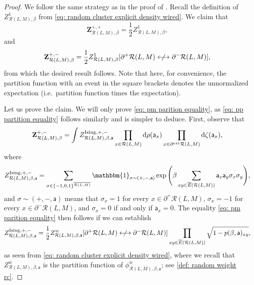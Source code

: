 \documentclass[11pt,a4paper]{article}
\numberwithin{equation}{section}
\theoremstyle{plain}
\theoremstyle{definition}
\begin{document}
\begin{proof} 
We follow the same strategy as in the proof of \cite[Lemma~5.3]{gunaratnam2025supercritical}. Recall the definition of $Z^1_{\mathcal{R}(L,M),\beta}$ from \eqref{eq: random cluster explicit density wired}. We claim that  
\begin{equation}\label{eq: pp partition equality}
\mathbf{Z}^{+,+}_{\mathcal{R}(L,M),\beta}=\frac{1}{2}Z^1_{\mathcal R(L,M),\beta},   
\end{equation}
and
\begin{equation}\label{eq: pm parition equality}
\mathbf{Z}^{+,-}_{\mathcal{R}(L,M),\beta}=\frac{1}{2}Z^1_{\mathcal R(L,M),\beta}[\partial^+\mathcal{R}(L,M)\centernot\longleftrightarrow \partial^-\mathcal{R}(L,M)],   
\end{equation}
from which the desired result follows. Note that here, for convenience, the partition function with an event in the square brackets denotes the unnormalized expectation (i.e.\ partition function times the expectation).

Let us prove the claim. We will only prove \eqref{eq: pm parition equality}, as \eqref{eq: pp partition equality} follows similarly and is simpler to deduce. First, observe that 
\begin{equation}
\mathbf{Z}^{+,-}_{\mathcal{R}(L,M),\beta}=\int Z^{\rm Ising,+,-}_{\mathcal{R}(L,M),\beta,\mathsf{a}}
\prod_{x\in \mathcal{R}(L,M)}\mathrm{d} \rho(\mathsf{a}_x) \prod_{x\in \partial^{\textup{ext}}\mathcal{R}(L,M)}\mathrm{d}\zeta(\mathsf{a}_x),  
\end{equation}
where
\begin{equation}\label{eq:Ising_def}
Z^{\rm Ising,+,-}_{\mathcal{R}(L,M),\beta,\mathsf{a}}=\sum_{\sigma\in \{-1,0,1\}^{\overline{\mathcal{R}(L,M)}}} \mathbbm{1}_{\sigma\sim (+,-,\mathsf{a})}
 \exp\Bigg( \beta\sum_{xy\in \overline{E}(\mathcal{R}(L,M))}  \mathsf a_x \mathsf{a}_y \sigma_x \sigma_y\Bigg),
\end{equation}
and $\sigma\sim (+,-,\mathsf{a})$ means that $\sigma_x=1$ for every $x\in \partial^+\mathcal{R}(L,M)$, $\sigma_x=-1$ for every $x\in \partial^-\mathcal{R}(L,M)$, and $\sigma_x=0$ if and only if $\mathsf{a}_x=0$. The equality \eqref{eq: pm parition equality} then follows if we can establish
\begin{equation}\label{eq: partition function equality}
Z^{\textup{Ising},+,-}_{\mathcal{R}(L,M),\beta, \mathsf{a}}=\frac{1}{2}{Z}^w_{\mathcal{R}(L,M),\beta, \mathsf{a}}[\partial^+\mathcal{R}(L,M)\centernot\longleftrightarrow\partial^-\mathcal{R}(L,M)]\prod_{xy \in \overline{E}(\mathcal{R}(L,M))} \sqrt{1-p(\beta,\mathsf a)_{xy}},
\end{equation}
as seen from \eqref{eq: random cluster explicit density wired}, where we recall that $Z^{w}_{\mathcal{R}(L,M),\beta,\mathsf{a}}$ is the partition function of $\phi^w_{\mathcal{R}(L,M),\beta,\mathsf{a}}$; see \eqref{def: random weight rc}.



\end{proof}
\end{document}
